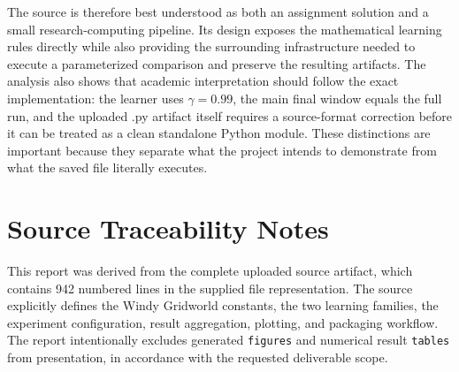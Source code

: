 \documentclass[11pt,a4paper]{article}
\begin{document}
The source is therefore best understood as both an assignment solution and a small research-computing pipeline. Its design exposes the mathematical learning rules directly while also providing the surrounding infrastructure needed to execute a parameterized comparison and preserve the resulting artifacts. The analysis also shows that academic interpretation should follow the exact implementation: the learner uses $\gamma=0.99$, the main final window equals the full run, and the uploaded .py artifact itself requires a source-format correction before it can be treated as a clean standalone Python module. These distinctions are important because they separate what the project intends to demonstrate from what the saved file literally executes.

\section*{Source Traceability Notes}
This report was derived from the complete uploaded source artifact, which contains 942 numbered lines in the supplied file representation. The source explicitly defines the Windy Gridworld constants, the two learning families, the experiment configuration, result aggregation, plotting, and packaging workflow. The report intentionally excludes generated \texttt{figures} and numerical result \texttt{tables} from presentation, in accordance with the requested deliverable scope.
\end{document}

